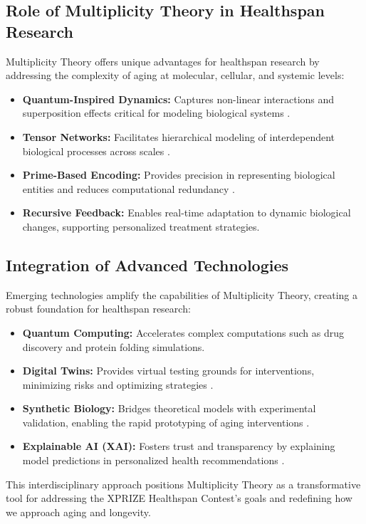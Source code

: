 \documentclass{article}
\theoremstyle{plain}
\begin{document}
\subsection{Role of Multiplicity Theory in Healthspan Research}
Multiplicity Theory offers unique advantages for healthspan research by addressing the complexity of aging at molecular, cellular, and systemic levels:
\begin{itemize}
    \item \textbf{Quantum-Inspired Dynamics:} Captures non-linear interactions and superposition effects critical for modeling biological systems \cite{quantum2023}.
    \item \textbf{Tensor Networks:} Facilitates hierarchical modeling of interdependent biological processes across scales \cite{tensor2023}.
    \item \textbf{Prime-Based Encoding:} Provides precision in representing biological entities and reduces computational redundancy \cite{primeEncoding2022}.
    \item \textbf{Recursive Feedback:} Enables real-time adaptation to dynamic biological changes, supporting personalized treatment strategies.
\end{itemize}

\subsection{Integration of Advanced Technologies}
Emerging technologies amplify the capabilities of Multiplicity Theory, creating a robust foundation for healthspan research:
\begin{itemize}
    \item \textbf{Quantum Computing:} Accelerates complex computations such as drug discovery and protein folding simulations.
    \item \textbf{Digital Twins:} Provides virtual testing grounds for interventions, minimizing risks and optimizing strategies \cite{digitalTwins2023}.
    \item \textbf{Synthetic Biology:} Bridges theoretical models with experimental validation, enabling the rapid prototyping of aging interventions \cite{syntheticBiology2023}.
    \item \textbf{Explainable AI (XAI):} Fosters trust and transparency by explaining model predictions in personalized health recommendations \cite{xai2023}.
\end{itemize}

This interdisciplinary approach positions Multiplicity Theory as a transformative tool for addressing the XPRIZE Healthspan Contest's goals and redefining how we approach aging and longevity.
\end{document}
